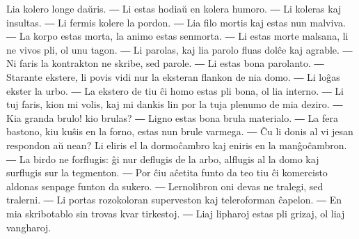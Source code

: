 Lia kolero longe daŭris. ― Li estas hodiaŭ en kolera humoro. ― Li koleras kaj insultas. ― Li fermis kolere la pordon. ― Lia filo mortis kaj estas nun malviva. ― La korpo estas morta, la animo estas senmorta. ― Li estas morte malsana, li ne vivos pli, ol unu tagon. ― Li parolas, kaj lia parolo fluas dolĉe kaj agrable. ― Ni faris la kontrakton ne skribe, sed parole. ― Li estas bona parolanto. ― Starante ekstere, li povis vidi nur la eksteran flankon de nia domo. ― Li loĝas ekster la urbo. ― La ekstero de tiu ĉi homo estas pli bona, ol lia interno. ― Li tuj faris, kion mi volis, kaj mi dankis lin por la tuja plenumo de mia deziro. ― Kia granda brulo! kio brulas? ― Ligno estas bona brula materialo. ― La fera bastono, kiu kuŝis en la forno, estas nun brule varmega. ― Ĉu li donis al vi jesan respondon aŭ nean? Li eliris el la dormoĉambro kaj eniris en la manĝoĉambron. ― La birdo ne forflugis: ĝi nur deflugis de la arbo, alflugis al la domo kaj surflugis sur la tegmenton. ― Por ĉiu aĉetita funto da teo tiu ĉi komercisto aldonas senpage funton da sukero. ― Lernolibron oni devas ne tralegi, sed tralerni. ― Li portas rozokoloran superveston kaj teleroforman ĉapelon. ― En mia skribotablo sin trovas kvar tirkestoj. ― Liaj lipharoj estas pli grizaj, ol liaj vangharoj.

